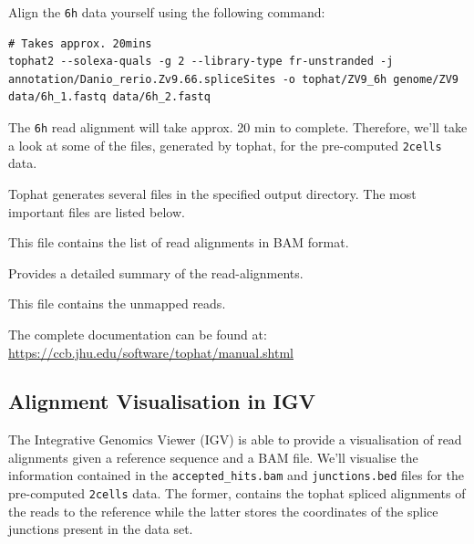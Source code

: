 \begin{steps}
Align the \texttt{6h} data yourself using the following command:  

\begin{lstlisting}
# Takes approx. 20mins
tophat2 --solexa-quals -g 2 --library-type fr-unstranded -j annotation/Danio_rerio.Zv9.66.spliceSites -o tophat/ZV9_6h genome/ZV9 data/6h_1.fastq data/6h_2.fastq
\end{lstlisting}

\end{steps}

The \texttt{6h} read alignment will take approx. 20 min to complete. Therefore,
we'll take a look at some of the files, generated by tophat, for the
pre-computed \texttt{2cells} data.


\begin{information}
Tophat generates several files in the specified output directory. The most important files are listed below.
\begin{description}[style=multiline,labelindent=0cm,align=right,leftmargin=\descriptionlabelspace,rightmargin=1.5cm,font=\ttfamily]
\item[accepted\_hits.bam] This file contains the list of read alignments in BAM format.
\item[align\_summary.txt] Provides a detailed summary of the read-alignments. 
\item[unmapped.bam] This file contains the unmapped reads.
\end{description}

The complete documentation can be found at:
\url{https://ccb.jhu.edu/software/tophat/manual.shtml}
\end{information}



\subsection{Alignment Visualisation in IGV}

The Integrative Genomics Viewer (IGV) is able to provide a visualisation of read
alignments given a reference sequence and a BAM file. We'll visualise the
information contained in the \texttt{accepted\_hits.bam} and
\texttt{junctions.bed} files for the pre-computed \texttt{2cells} data. The
former, contains the tophat spliced alignments of the reads to the reference
while the latter stores the coordinates of the splice junctions present in the
data set.

